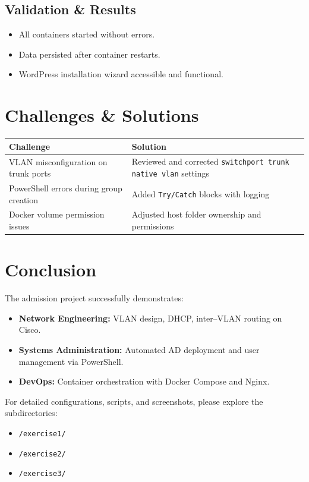 \documentclass[11pt,a4paper]{article}
\begin{document}
\subsection{Validation \& Results}
\begin{itemize}
  \item All containers started without errors.
  \item Data persisted after container restarts.
  \item WordPress installation wizard accessible and functional.
\end{itemize}

\section*{Challenges \& Solutions}
\begin{tabular}{|p{6cm}|p{8cm}|}
\hline
\textbf{Challenge} & \textbf{Solution} \\ \hline
VLAN misconfiguration on trunk ports & Reviewed and corrected \texttt{switchport trunk native vlan} settings \\ \hline
PowerShell errors during group creation & Added \texttt{Try/Catch} blocks with logging \\ \hline
Docker volume permission issues & Adjusted host folder ownership and permissions \\ \hline
\end{tabular}

\section*{Conclusion}
The admission project successfully demonstrates:
\begin{itemize}
  \item \textbf{Network Engineering:} VLAN design, DHCP, inter–VLAN routing on Cisco.
  \item \textbf{Systems Administration:} Automated AD deployment and user management via PowerShell.
  \item \textbf{DevOps:} Container orchestration with Docker Compose and Nginx.
\end{itemize}
For detailed configurations, scripts, and screenshots, please explore the subdirectories:
\begin{itemize}
  \item \texttt{/exercise1/}
  \item \texttt{/exercise2/}
  \item \texttt{/exercise3/}
\end{itemize}
\end{document}
